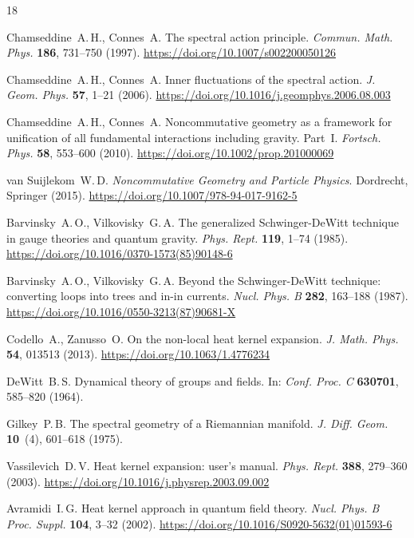 \documentclass[12pt,a4paper]{article}
\begin{document}
\begin{thebibliography}{18}

 Chamseddine~A.\,H., Connes~A. The spectral action principle. \textit{Commun. Math. Phys.} \textbf{186}, 731--750 (1997). \url{https://doi.org/10.1007/s002200050126}

 Chamseddine~A.\,H., Connes~A. Inner fluctuations of the spectral action. \textit{J. Geom. Phys.} \textbf{57}, 1--21 (2006). \url{https://doi.org/10.1016/j.geomphys.2006.08.003}

 Chamseddine~A.\,H., Connes~A. Noncommutative geometry as a framework for unification of all fundamental interactions including gravity. Part~I. \textit{Fortsch. Phys.} \textbf{58}, 553--600 (2010). \url{https://doi.org/10.1002/prop.201000069}

 van Suijlekom~W.\,D. \textit{Noncommutative Geometry and Particle Physics}. Dordrecht, Springer (2015). \url{https://doi.org/10.1007/978-94-017-9162-5}

 Barvinsky~A.\,O., Vilkovisky~G.\,A. The generalized Schwinger-DeWitt technique in gauge theories and quantum gravity. \textit{Phys. Rept.} \textbf{119}, 1--74 (1985). \url{https://doi.org/10.1016/0370-1573(85)90148-6}

 Barvinsky~A.\,O., Vilkovisky~G.\,A. Beyond the Schwinger-DeWitt technique: converting loops into trees and in-in currents. \textit{Nucl. Phys. B} \textbf{282}, 163--188 (1987). \url{https://doi.org/10.1016/0550-3213(87)90681-X}

 Codello~A., Zanusso~O. On the non-local heat kernel expansion. \textit{J. Math. Phys.} \textbf{54}, 013513 (2013). \url{https://doi.org/10.1063/1.4776234}

 DeWitt~B.\,S. Dynamical theory of groups and fields. In: \textit{Conf. Proc. C} \textbf{630701}, 585--820 (1964).

 Gilkey~P.\,B. The spectral geometry of a Riemannian manifold. \textit{J. Diff. Geom.} \textbf{10}~(4), 601--618 (1975).

 Vassilevich~D.\,V. Heat kernel expansion: user's manual. \textit{Phys. Rept.} \textbf{388}, 279--360 (2003). \url{https://doi.org/10.1016/j.physrep.2003.09.002}

 Avramidi~I.\,G. Heat kernel approach in quantum field theory. \textit{Nucl. Phys. B Proc. Suppl.} \textbf{104}, 3--32 (2002). \url{https://doi.org/10.1016/S0920-5632(01)01593-6}


\end{thebibliography}
\end{document}
